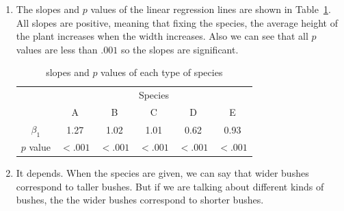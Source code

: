 \documentclass[12pt]{article}
\begin{document}
\begin{enumerate}
\item The slopes and $p$ values of the linear regression lines are shown in Table~\ref{Tab:3}. All slopes are positive, meaning that fixing the species, the average height of the plant increases when the width increases. Also we can see that all $p$ values are less than $.001$ so the slopes are significant.

\begin{table}[htpb]
	\centering
	\begin{tabular}{cccccc}
		\toprule
		\multirow{2}{*}{} &
		\multicolumn{5}{c}{Species}\\
		 & A & B & C & D & E \\
		\midrule
		$\beta_1$ &1.27&1.02&1.01&0.62&0.93\\
		\hline
		$p$ value & $<.001$ & $<.001$ & $<.001$ & $<.001$ & $<.001$ \\
		\bottomrule
	\end{tabular}
	\caption{slopes and $p$ values of each type of species}
	\label{Tab:3}
\end{table}

\item It depends. When the species are given, we can say that wider bushes correspond to taller bushes. But if we are talking about different kinds of bushes, the the wider bushes correspond to shorter bushes.

\end{enumerate}
	
\end{document}
